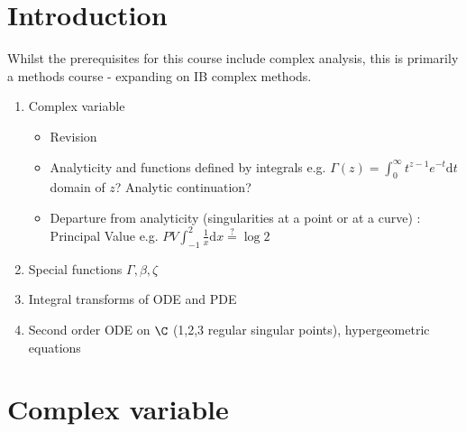 \documentclass[a4paper]{article}
\begin{document}
\section{Introduction}
Whilst the prerequisites for this course include complex analysis, this is primarily a methods course - expanding on IB complex methods. 
\begin{enumerate}
    \item Complex variable
        \begin{itemize}
            \item Revision
            \item Analyticity and functions defined by integrals e.g. $\Gamma (z) = \int_0^{\infty} t^{ z - 1} e^{ - t}\text{d}t$ domain of $z$? Analytic continuation?
        \item Departure from analyticity (singularities at a point or at a curve) : Principal Value e.g. $PV \int_{-1}^{2} \frac{1}{x} \text{d}x \overset{?}{=} \log 2$
        \end{itemize}
    \item Special functions
        $\Gamma, \beta , \zeta$
    \item Integral transforms of ODE and PDE
    \item Second order ODE on $\C$ (1,2,3 regular singular points), hypergeometric equations
\end{enumerate}
\section{Complex variable}
\end{document}
